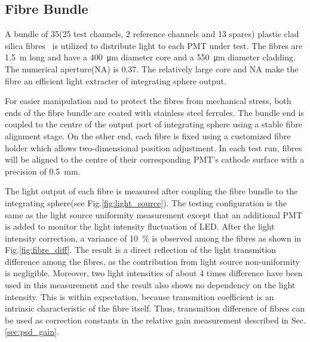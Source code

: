 \documentclass[5p, times]{elsarticle}
\begin{document}

\subsection{Fibre Bundle}
\label{sec:fibre_bundle}

A bundle of 35(25 test channels, 2 reference channels and 13 spares) plastic clad silica fibres~\cite{optical_fibre} is utilized to distribute light to each PMT under test.
The fibres are \SI{1.5}{\meter} long and have a \SI{400}{\micro\meter} diameter core and a \SI{550}{\micro\meter} diameter cladding.
The numerical aperture(NA) is 0.37.
The relatively large core and NA make the fibre an efficient light extracter of integrating sphere output. 

For easier manipulation and to protect the fibres from mechanical stress, both ends of the fibre bundle are coated with stainless steel ferrules.
The bundle end is coupled to the centre of the output port of integrating sphere using a stable fibre alignment stage.
On the other end, each fibre is fixed using a customized fibre holder which allows two-dimensional position adjustment.
In each test run, fibres will be aligned to the centre of their corresponding PMT's cathode surface with a precision of \SI{0.5}{\milli\meter}.  

The light output of each fibre is measured after coupling the fibre bundle to the integrating sphere(see Fig.\ref{fig:light_source}).
The testing configuration is the same as the light source uniformity measurement except that an additional PMT is added to monitor the light intensity fluctuation of LED.
After the light intensity correction, a variance of \SI{10}{\percent} is observed among the fibres as shown in Fig.\ref{fig:fibre_diff}.
The result is a direct reflection of the light transmition difference among the fibres, as the contribution from light source non-uniformity is negligible.
Moreover, two light intensities of about 4 times difference have been used in this measurement and the result also shows no dependency on the light intensity. 
This is within expectation, because transmition coefficient is an intrinsic characteristic of the fibre itself.
Thus, transmition difference of fibres can be used as correction constants in the relative gain measurement described in Sec.\ref{sec:psd_gain}.
\end{document}
